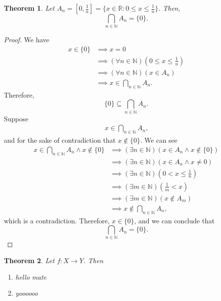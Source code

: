 \documentclass[12pt,a4paper]{article}
\author{Jeremiah Givens}
\theoremstyle{theorem}
\newtheorem{theorem}{Theorem}
\theoremstyle{definition}
\begin{document}
\begin{theorem}
Let $A_n = \left[ 0, \frac{1}{n}\right] = \{ x \in \mathbb{R} : 0 \leq x \leq \frac{1}{n} \}$. Then, 
\begin{equation*}
\bigcap_{n \in \mathbb{N}} A_n = \{0 \} \text{.}
\end{equation*}
\end{theorem}
\begin{proof}
We have 
\begin{align*}
x \in \{0 \} &\implies x = 0 \\
&\implies (\forall n \in \mathbb{N})(0 \leq x \leq \frac{1}{n})\\
&\implies (\forall n \in \mathbb{N})(x \in A_n)\\
&\implies x \in \bigcap_{n \in \mathbb{N}} A_n \text{.}
\end{align*}
Therefore, 
\begin{equation*}
\{ 0 \} \subseteq \bigcap_{n \in \mathbb{N}} A_n.
\end{equation*}
Suppose
\begin{align*}
x \in \bigcap_{n \in \mathbb{N}} A_n \text{,}
\end{align*}
and for the sake of contradiction that $x \not \in \{ 0 \}$.
We can see
\begin{align*}
x \in \bigcap_{n \in \mathbb{N}} A_n \land x \not \in \{0 \} &\implies (\exists n \in \mathbb{N}) (x \in A_n \land x\not \in \{0 \})\\
&\implies (\exists n \in \mathbb{N}) (x \in A_n \land x \neq 0)\\
&\implies (\exists n \in \mathbb{N}) (0 < x \leq \frac{1}{n})\\
&\implies (\exists m \in \mathbb{N})(\frac{1}{m} < x)\\
&\implies (\exists m \in \mathbb{N})(x \not \in A_m)\\
&\implies x \not \in \bigcap_{n \in \mathbb{N}} A_n \text{,}
\end{align*}
which is a contradiction. Therefore, $x \in \{0 \}$, and we can conclude that 
\begin{equation*}
\bigcap_{n \in \mathbb{N}} A_n = \{0 \} \text{.}
\end{equation*}
\end{proof}

\begin{theorem}
Let $f: X \to Y$. Then
\begin{enumerate}
\item hello mate
\item yoooooo
\end{enumerate}
\end{theorem}
\end{document}
